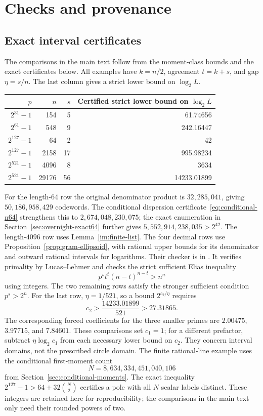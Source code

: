 \documentclass[11pt,letterpaper]{article}
\theoremstyle{definition}
\theoremstyle{remark}
\begin{document}
\section{Checks and provenance}
\subsection{Exact interval certificates}\label{app:finite-certificates}

The comparisons in the main text follow from the moment-class bounds
and the exact certificates below. All examples have $k=n/2$,
agreement $t=k+s$, and gap $\eta=s/n$. The last column gives a
strict lower bound on $\log_2L$.
\begin{center}
\begin{tabular}{rrrr}
\toprule
$p$ & $n$ & $s$ & Certified strict lower bound on $\log_2 L$\\
\midrule
$2^{31}-1$ & 154 & 5 & 61.74656\\
$2^{61}-1$ & 548 & 9 & 242.16447\\
 $2^{127}-1$ & 64 & 2 & 42\\
$2^{127}-1$ & 2158 & 17 & 995.98234\\
$2^{521}-1$ & 4096 & 8 & 3634\\
$2^{521}-1$ & 29176 & 56 & 14233.01899\\
\bottomrule
\end{tabular}
\end{center}
For the length-$64$ row the original denominator product is $32{,}285{,}041$,
giving $50{,}186{,}958{,}429$ codewords. The conditional dispersion
certificate~\eqref{eq:conditional-n64} strengthens this to
$2{,}674{,}048{,}230{,}075$; the exact enumeration in
Section~\ref{sec:overnight-exact64} further gives
$5{,}552{,}914{,}238{,}035>2^{42}$.
The length-$4096$ row uses Lemma~\ref{im:finite-list}. The four
decimal rows use Proposition~\ref{prop:gram-ellipsoid}, with rational
upper bounds for its denominator and outward rational intervals for
logarithms. Their checker is in
. It verifies primality
by Lucas--Lehmer and checks the strict sufficient Elias inequality
\[
 p^s t^t(n-t)^{n-t}>n^n
\]
using integers. The two remaining rows satisfy the stronger sufficient
condition $p^s>2^n$. For the last row, $\eta=1/521$, so a bound
$2^{c_2/\eta}$ requires
\[
 c_2>\frac{14233.01899}{521}>27.31865.
\]
The corresponding forced coefficients for the three smaller primes
are $2.00475$, $3.97715$, and $7.84601$. These comparisons set
$c_1=1$; for a different prefactor, subtract
$\eta\log_2c_1$ from each necessary lower bound on $c_2$.
They concern interval domains, not the prescribed circle domain.
The finite rational-line example uses the conditional first-moment count
\[
 N=8{,}634{,}334{,}451{,}040{,}106
\]
from Section~\ref{sec:conditional-moments}.
The exact inequality $2^{127}-1>64+32\binom N2$ certifies a pole with
all $N$ scalar labels distinct. These integers are retained here for
reproducibility; the comparisons in the main text only need their
rounded powers of two.
\end{document}
